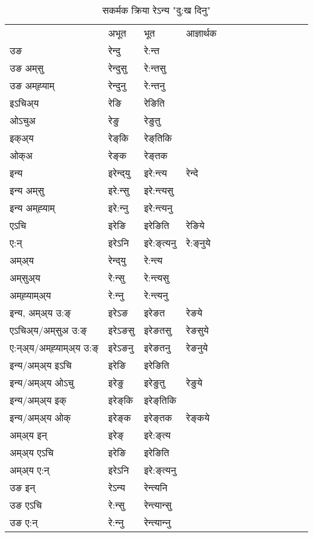 \begin{table}[H]
\centering
\caption{\label{eŋt.vt} सकर्मक क्रिया  रेऽन्य  "दु:ख दिनु"  }
\begin{tabular}{l|l|l|l|l|l|l|l|l|l|l|l|l}  \toprule
&अभूत & भूत & आज्ञार्थक \\ 
उङ &रेन्दु &रे:न्त \\ 
उङ अम्‌सु&रेन्दुसु &रे:न्तसु \\ 
उङ अम्‌ह्‍याम्&रेन्दुनु &रे:न्तनु \\ 
इऽचिअ्य &रेङि &रेङिति   \\ 
ओऽचुअ        &रेङु &रेङुतु   \\ 
इक्अ्य&रेङ्‌कि &रेङ्‌तिकि   \\ 
ओक्अ &रेङ्‌क &रेङ्‌तक   \\ 
इन्य & इरेन्द्‌यु  & इरे:न्त्य &रेन्दे  \\ 
इन्य अम्‌सु& इरे:न्सु  & इरे:न्त्यसु   \\ 
इन्य अम्‌ह्‍याम्& इरे:न्‍नु  & इरे:न्त्यनु   \\ 
एऽचि & इरेङि & इरेङिति &रेङिये    \\ 
ए:न् & इरेऽनि  & इरे:ङ्‌त्यनु &रे:ङ्‌नुये  \\ 
अम्अ्य & रेन्द्‌यु  & रे:न्त्य  \\ 
अम्‌सुअ्य & रे:न्सु & रे:न्त्यसु  \\ 
अम्‌ह्‍याम्अ्य & रे:न्‍नु  & रे:न्त्यनु \\ 
\midrule
इन्य, अम्अ्य उ:ङ्‌ &इरेऽङ &इरेङत &रेङये \\ 
एऽचिअ्य/अम्‌सुअ उ:ङ्‌ &इरेऽङसु &इरेङतसु &रेङसुये \\ 
ए:न्अ्य/अम्‌ह्‍याम्अ्य उ:ङ्‌ &इरेऽङनु &इरेङतनु &रेङनुये \\ 
इन्य/अम्अ्य इऽचि &इरेङि &इरेङिति    \\ 
इन्य/अम्अ्य ओऽचु &इरेङु &इरेङुतु  &रेङुये  \\ 
इन्य/अम्अ्य इक् &इरेङ्‌कि &इरेङ्‌तिकि   \\ 
इन्य/अम्अ्य ओक् &इरेङ्‌क &इरेङ्‌तक  &रेङ्‌कये  \\ 
अम्अ्य इन् & इरेङ्‌ & इरे:ङ्‌त्य   \\ 
अम्अ्य एऽचि & इरेङि & इरेङिति    \\ 
अम्अ्य ए:न् & इरेऽनि  & इरे:ङ्‌त्यनु  \\ 
\midrule
उङ इन् & रेऽन्य  & रेन्त्यनि  \\ 
उङ एऽचि & रे:न्सु  & रेन्त्यान्सु   \\ 
उङ ए:न्& रे:न्‍नु  & रेन्त्यान्‍नु   \\ 
\bottomrule
\end{tabular}
\end{table}


